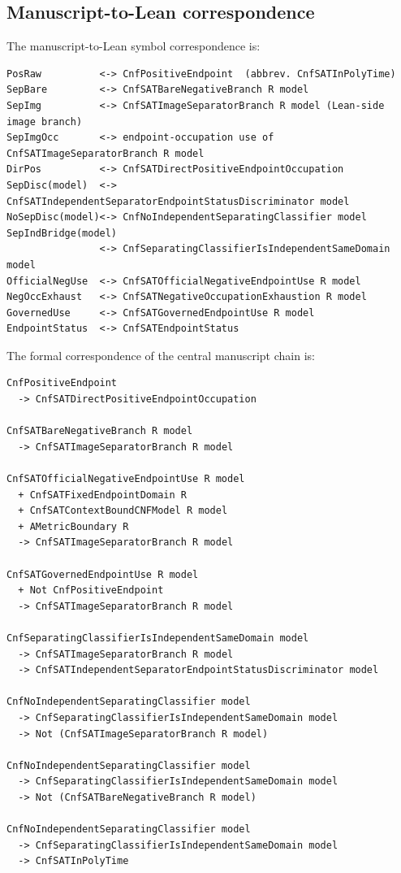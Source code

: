 \documentclass[11pt]{article}
\theoremstyle{definition}
\theoremstyle{remark}
\begin{document}
\subsection{Manuscript-to-Lean correspondence}

The manuscript-to-Lean symbol correspondence is:
\begin{lstlisting}[basicstyle=\ttfamily\scriptsize]
PosRaw          <-> CnfPositiveEndpoint  (abbrev. CnfSATInPolyTime)
SepBare         <-> CnfSATBareNegativeBranch R model
SepImg          <-> CnfSATImageSeparatorBranch R model (Lean-side image branch)
SepImgOcc       <-> endpoint-occupation use of CnfSATImageSeparatorBranch R model
DirPos          <-> CnfSATDirectPositiveEndpointOccupation
SepDisc(model)  <-> CnfSATIndependentSeparatorEndpointStatusDiscriminator model
NoSepDisc(model)<-> CnfNoIndependentSeparatingClassifier model
SepIndBridge(model)
                <-> CnfSeparatingClassifierIsIndependentSameDomain model
OfficialNegUse  <-> CnfSATOfficialNegativeEndpointUse R model
NegOccExhaust   <-> CnfSATNegativeOccupationExhaustion R model
GovernedUse     <-> CnfSATGovernedEndpointUse R model
EndpointStatus  <-> CnfSATEndpointStatus
\end{lstlisting}

The formal correspondence of the central manuscript chain is:
\begin{lstlisting}[basicstyle=\ttfamily\scriptsize]
CnfPositiveEndpoint
  -> CnfSATDirectPositiveEndpointOccupation

CnfSATBareNegativeBranch R model
  -> CnfSATImageSeparatorBranch R model

CnfSATOfficialNegativeEndpointUse R model
  + CnfSATFixedEndpointDomain R
  + CnfSATContextBoundCNFModel R model
  + AMetricBoundary R
  -> CnfSATImageSeparatorBranch R model

CnfSATGovernedEndpointUse R model
  + Not CnfPositiveEndpoint
  -> CnfSATImageSeparatorBranch R model

CnfSeparatingClassifierIsIndependentSameDomain model
  -> CnfSATImageSeparatorBranch R model
  -> CnfSATIndependentSeparatorEndpointStatusDiscriminator model

CnfNoIndependentSeparatingClassifier model
  -> CnfSeparatingClassifierIsIndependentSameDomain model
  -> Not (CnfSATImageSeparatorBranch R model)

CnfNoIndependentSeparatingClassifier model
  -> CnfSeparatingClassifierIsIndependentSameDomain model
  -> Not (CnfSATBareNegativeBranch R model)

CnfNoIndependentSeparatingClassifier model
  -> CnfSeparatingClassifierIsIndependentSameDomain model
  -> CnfSATInPolyTime
\end{lstlisting}
\end{document}
